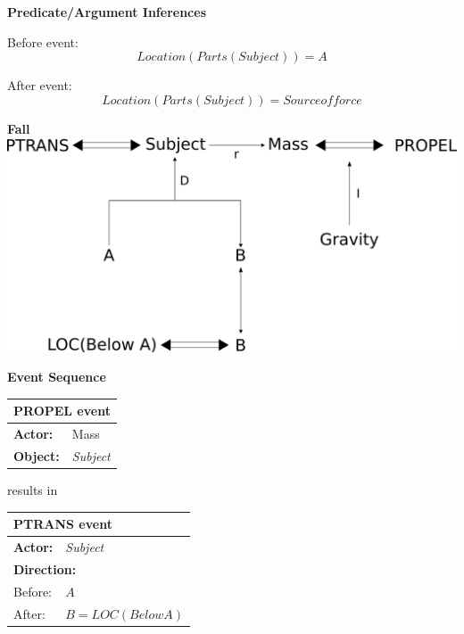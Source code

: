 \documentclass[../dissertation]{subfiles}
\begin{document}
\bigskip

\textbf{Predicate/Argument Inferences}


Before event:
\[Location(Parts(Subject)) = A\]

After event:
\[Location(Parts(Subject)) = Source of force\]
\newpage

\textbf{Fall}
\includegraphics[width=\linewidth]{fall-cd.png}
\bigskip

\textbf{Event Sequence}

\begin{center}
  \begin{tabular}{l l}
  \toprule
  \multicolumn{2}{l}{\textbf{PROPEL event}}\\
  \hline
  \textbf{Actor:} & Mass\\
  \textbf{Object:} & \textit{Subject}\\
	\bottomrule
  \end{tabular}
  
  \smallskip
  results in
  \smallskip
  
  \begin{tabular}{l l}
    \toprule
    \multicolumn{2}{l}{\textbf{PTRANS event}}\\
    \hline
    \textbf{Actor:} & \textit{Subject}\\
    \multicolumn{2}{l}{\textbf{Direction:}} \\
    Before: & \(A\)\\
    After: & \(B = LOC(Below A)\)\\
    \bottomrule
  \end{tabular}
  
\end{center}
\end{document}
